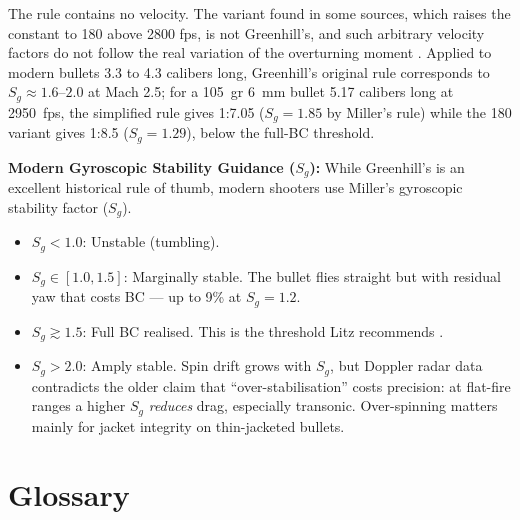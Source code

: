 \documentclass[11pt,twoside,openright]{report}
\begin{document}
The rule contains no velocity. The variant found in some sources, which raises the constant to 180 above 2800 fps, is not Greenhill's, and such arbitrary velocity factors do not follow the real variation of the overturning moment \citep{miller2006greenhill}. Applied to modern bullets 3.3 to 4.3 calibers long, Greenhill's original rule corresponds to $S_g \approx 1.6$--$2.0$ at Mach 2.5; for a 105~gr 6~mm bullet 5.17 calibers long at 2950~fps, the simplified rule gives 1:7.05 ($S_g = 1.85$ by Miller's rule) while the 180 variant gives 1:8.5 ($S_g = 1.29$), below the full-BC threshold.

\textbf{Modern Gyroscopic Stability Guidance ($S_g$):}
While Greenhill's is an excellent historical rule of thumb, modern shooters use Miller's gyroscopic stability factor ($S_g$). 
\begin{itemize}[noitemsep]
    \item $S_g < 1.0$: Unstable (tumbling).
    \item $S_g \in [1.0, 1.5]$: Marginally stable. The bullet flies straight but with residual yaw that costs BC --- up to 9\% at $S_g = 1.2$.
    \item $S_g \gtrsim 1.5$: Full BC realised. This is the threshold Litz recommends \citep[p.~161]{litz2015applied}.
    \item $S_g > 2.0$: Amply stable. Spin drift grows with $S_g$, but Doppler radar data contradicts the older claim that ``over-stabilisation'' costs precision: at flat-fire ranges a higher $S_g$ \emph{reduces} drag, especially transonic. Over-spinning matters mainly for jacket integrity on thin-jacketed bullets.
\end{itemize}


\nocite{*}



\chapter*{Glossary}
\end{document}
